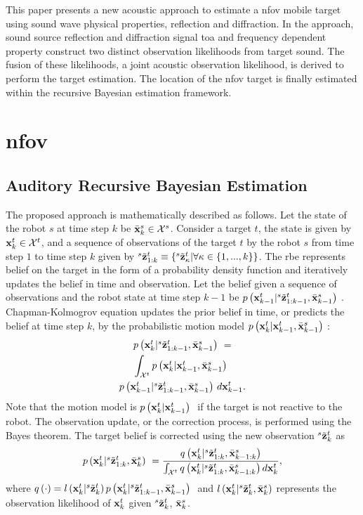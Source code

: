 \documentclass[letterpaper, 10 pt, conference]{ieeeconf}  %
\begin{document}
This paper presents a new acoustic approach to estimate a \gls{nfov} mobile target using sound wave physical properties, reflection and diffraction. In the approach, sound source reflection and diffraction signal \gls{toa} and frequency dependent property construct two distinct observation likelihoods from target sound. The fusion of these likelihoods, a joint acoustic observation likelihood, is derived to perform the target estimation. The location of the \gls{nfov} target is finally estimated within the recursive Bayesian estimation framework.

\section{\gls{nfov}}
\subsection{Auditory Recursive Bayesian Estimation}
The proposed approach is mathematically described as follows. Let the state of the robot $s$ at time step $k$ be $\bar {\mathbf{x}}_{k}^{s} \in \mathcal{X}^s$. Consider a target $t$, the state is given by $\mathbf{x}_{k}^{t} \in \mathcal{X}^t$, and a sequence of observations of the target $t$ by the robot $s$ from time step $1$ to time step $k$ given by ${}^{s}\tilde {\mathbf{z}}_{1:k}^{t} \equiv \left \{ {}^{s}\tilde {\mathbf{z}}_{\kappa}^{t}|\forall \kappa \in \left \{ 1,...,k \right \} \right \}$. The \gls{rbe} represents belief on the target in the form of a probability density function and iteratively updates the belief in time and observation.  Let the belief given a sequence of observations and the robot state at time step ${k-1}$ be  $\mbox{$ {p} \left ( \mathbf{x}_{k-1}^{t}|{}^{s}\tilde {\mathbf{z}}_{1:k-1}^{t},\bar {\mathbf{x}}_{k-1}^{s} \right )$ }$.  Chapman-Kolmogrov equation updates the prior belief in time, or predicts the belief at time step $k$, by the probabilistic motion model $\mbox{$ {p} \left ( \mathbf{x}_{k}^{t}|\mathbf{x}_{k-1}^{t},\bar {\mathbf{x}}_{k-1}^{s} \right )$ }$: 
\begin{multline}\label{eq:predictT}
\mbox{$ {p} \left ( \mathbf{x}_{k}^{t}|{}^{s}\tilde {\mathbf{z}}_{1:k-1}^{t},\bar {\mathbf{x}}_{k-1}^{s} \right )$ } =\\ \int_{\mathcal{X}^t} \mbox{$ {p} \left ( \mathbf{x}_{k}^{t}|\mathbf{x}_{k-1}^{t},\bar {\mathbf{x}}_{k-1}^{s} \right )$ } \\  \mbox{$ {p} \left ( \mathbf{x}_{k-1}^{t}|{}^{s}\tilde {\mathbf{z}}_{1:k-1}^{t},\bar {\mathbf{x}}_{k-1}^{s} \right )$ } d\mathbf{x}_{k-1}^{t}.
\end{multline}
Note that the motion model is $\mbox{$ {p} \left ( \mathbf{x}_{k}^{t}|\mathbf{x}_{k-1}^{t} \right )$ }$ if the target is not reactive to the robot.  The observation update, or the correction process, is performed using the Bayes theorem.  The target belief is corrected using the new observation ${}^{s}\tilde {\mathbf{z}}_{k}^{t}$ as
\begin{eqnarray}\label{eq:correctT}
\mbox{$ {p} \left ( \mathbf{x}_{k}^{t}|{}^{s}\tilde {\mathbf{z}}_{1:k}^{t},\bar {\mathbf{x}}_{k}^{s} \right )$ } =  \frac{q \left ( \mathbf{x}_{k}^{t}|{}^{s}\tilde {\mathbf{z}}_{1:k}^{t},\bar {\mathbf{x}}_{k-1:k}^{s} \right )} {\int_{\mathcal{X}^t}
	q \left ( \mathbf{x}_{k}^{t}|{}^{s}\tilde {\mathbf{z}}_{1:k}^{t},\bar {\mathbf{x}}_{k-1:k}^{s} \right ) d\mathbf{x}_{k}^{t}},
\end{eqnarray}
where $q \left ( \cdot \right ) = {l \left ( \mathbf{x}_{k}^{t}|{}^{s}\tilde {\mathbf{z}}_{k}^{t} \right ) \mbox{$ {p} \left ( \mathbf{x}_{k}^{t}|{}^{s}\tilde {\mathbf{z}}_{1:k-1}^{t},\bar {\mathbf{x}}_{k-1}^{s} \right )$ }}$ and $l \left ( \mathbf{x}_{k}^{t}|{}^{s}\tilde {\mathbf{z}}_{k}^{t},\bar {\mathbf{x}}_{k}^{s} \right )$ represents the observation likelihood of $\mathbf{x}_{k}^{t}$ given ${}^{s}\tilde {\mathbf{z}}_{k}^{t}$, $\bar {\mathbf{x}}_{k}^{s}$.  
\end{document}

